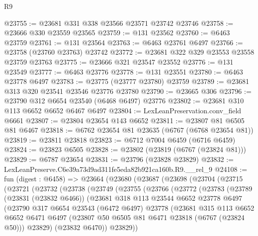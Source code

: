 \begin{lexlean}{R9}
\begin{coremodule}
@23755 := @23681 @331 @338 @23566 @23571 @23742 @23746
@23758 := @23666 @330 @23559 @23565
@23759 := @131 @23562
@23760 := @6463 @23759
@23761 := @131 @23564
@23763 := @6463 @23761 @6497
@23766 := @23758 (@23760 @23763) @23742
@23772 := @23681 @322 @329 @23553 @23558 @23759 @23763
@23775 := @23666 @321 @23547 @23552
@23776 := @131 @23549
@23777 := @6463 @23776
@23778 := @131 @23551
@23780 := @6463 @23778 @6497
@23783 := @23775 (@23777 @23780) @23759
@23789 := @23681 @313 @320 @23541 @23546 @23776 @23780
@23790 := @23665 @306
@23796 := @23790 @312 @6654 @23540 (@6468 @6497) @23776
@23802 := @23681 @310 @113 @6652 @6652 @6467 @6497
@23804 := LexLeanPreservation.conv_field @6661
@23807 := @23804 @23654 @143 @6652
@23811 := @23807 @81 @6505 @81 @6467
@23818 := @6762 @23654 @81 @23635 (@6767 (@6768 @23654 @81))
@23819 := @23811 @23818
@23823 := @6712 @7004 @6459 (@6716 @6459)
@23824 := @23823 @6505
@23828 := @23802 (@23819 (@6767 (@23824 @81)))
@23829 := @6787 @23654
@23831 := @23796 (@23828 @23829)
@23832 := LexLeanPreserve.C6e39a73d9ad311fe5eda82b921ca160b.R9.__rel_9
@24108 := fun (digest : @6458) =>
  @23664
    (@23680
      (@23687
        (@23698
          (@23704
            (@23715
              (@23721
                (@23732
                  (@23738
                    (@23749
                      (@23755
                        (@23766
                          (@23772
                            (@23783
                              (@23789
                                (@23831 (@23832 @6466))
                                (@23681
                                  @318
                                  @113
                                  @23544
                                  @6652
                                  @23778
                                  @6497
                                  (@23790
                                    @317
                                    @6654
                                    @23543
                                    (@6472 @6497)
                                    @23778
                                    (@23681
                                      @315
                                      @113
                                      @6652
                                      @6652
                                      @6471
                                      @6497
                                      (@23807 @50 @6505 @81 @6471 @23818 (@6767 (@23824 @50)))
                                      @23829)
                                    (@23832 @6470))
                                  @23829))

\end{coremodule}
\end{lexlean}
